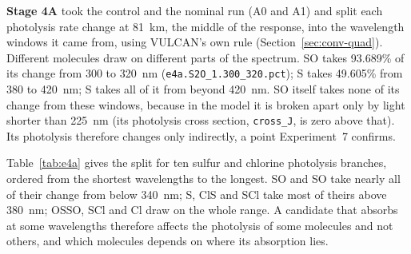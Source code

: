 \textbf{Stage 4A} took the control and the nominal run (A0 and A1) and split each photolysis rate change at
81~km, the middle of the response, into the wavelength windows it came from, using VULCAN's own rule
(Section~\ref{sec:conv-quad}). Different molecules draw on different parts of the
spectrum. SO takes 93.689\% of its change from 300 to 320~nm
(\texttt{e4a.S2O\_1.300\_320.pct}); S takes 49.605\% from 380 to 420~nm; S
takes all of it from beyond 420~nm. SO itself takes none of its change from these
windows, because in the model it is broken apart only by light shorter than 225~nm
(its photolysis cross section, \texttt{cross\_J}, is zero above that). Its photolysis
therefore changes only indirectly, a point Experiment~7 confirms.

Table~\ref{tab:e4a} gives the split for ten sulfur and chlorine photolysis branches,
ordered from the shortest wavelengths to the longest. SO and SO take
nearly all of their change from below 340~nm; S, ClS and SCl take most of
theirs above 380~nm; OSSO, SCl and Cl draw on the whole range. A candidate
that absorbs at some wavelengths therefore affects the photolysis of some molecules and
not others, and which molecules depends on where its absorption lies.

